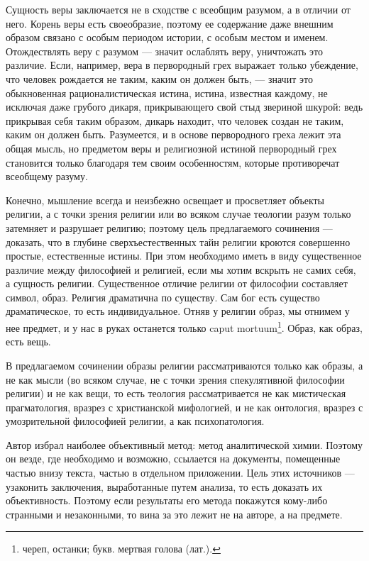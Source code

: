 \documentclass[12pt,oneside]{book}
\begin{document}
Сущность веры заключается не в сходстве с всеобщим разумом, а в отличии от него. Корень веры есть своеобразие, поэтому ее содержание даже внешним образом связано с особым периодом истории, с особым местом и именем. Отождествлять веру с разумом --- значит ослаблять веру, уничтожать это различие. Если, например, вера в первородный грех выражает только убеждение, что человек рождается не таким, каким он должен быть, --- значит это обыкновенная рационалистическая истина, истина, известная каждому, не исключая даже грубого дикаря, прикрывающего свой стыд звериной шкурой: ведь прикрывая себя таким образом, дикарь находит, что человек создан не таким, каким он должен быть. Разумеется, и в основе первородного греха лежит эта общая мысль, но предметом веры и религиозной истиной первородный грех становится только благодаря тем своим особенностям, которые противоречат всеобщему разуму.

Конечно, мышление всегда и неизбежно освещает и просветляет объекты религии, а с точки зрения религии или во всяком случае теологии разум только затемняет и разрушает религию; поэтому цель предлагаемого сочинения --- доказать, что в глубине сверхъестественных тайн религии кроются совершенно простые, естественные истины. При этом необходимо иметь в виду существенное различие между философией и религией, если мы хотим вскрыть не самих себя, а сущность религии. Существенное отличие религии от философии составляет символ, образ. Религия драматична по существу. Сам бог есть существо драматическое, то есть индивидуальное. Отняв у религии образ, мы отнимем у нее предмет, и у нас в руках останется только caput mortuum\footnote{череп, останки; букв. мертвая голова (лат.).}. Образ, как образ, есть вещь.

В предлагаемом сочинении образы религии рассматриваются только как образы, а не как мысли (во всяком случае, не с точки зрения спекулятивной философии религии) и не как вещи, то есть теология рассматривается не как мистическая прагматология, вразрез с христианской мифологией, и не как онтология, вразрез с умозрительной философией религии, а как психопатология.

Автор избрал наиболее объективный метод: метод аналитической химии. Поэтому он везде, где необходимо и возможно, ссылается на документы, помещенные частью внизу текста, частью в отдельном приложении. Цель этих источников --- узаконить заключения, выработанные путем анализа, то есть доказать их объективность. Поэтому если результаты его метода покажутся кому-либо странными и незаконными, то вина за это лежит не на авторе, а на предмете.
\end{document}
